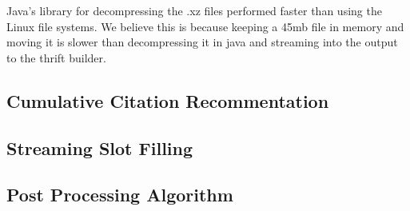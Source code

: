 Java’s library for decompressing the .xz files performed faster than using the Linux file systems. We believe this is because keeping a 45mb file in memory and moving it is slower than decompressing it in java and streaming into the output to the thrift builder.


\subsection{Cumulative Citation Recommentation}


\subsection{Streaming Slot Filling}


\subsection{Post Processing Algorithm}


